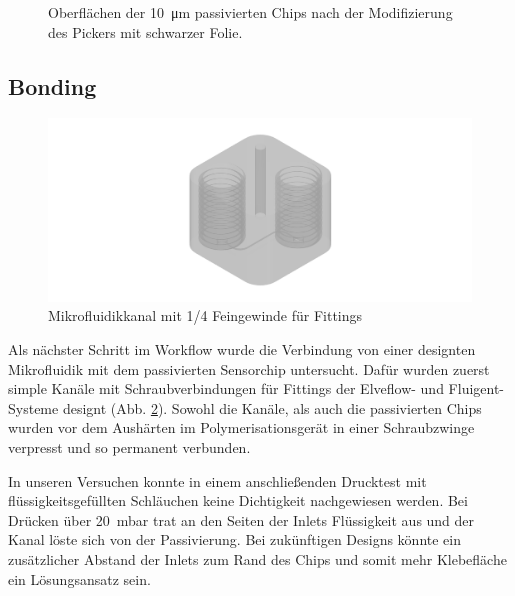 \begin{figure}[htb!]
\begin{subfigure}[r]{0.3\linewidth}
\end{subfigure}
\caption{Oberflächen der \SI{10}{\micro\meter} passivierten Chips nach der Modifizierung des Pickers mit schwarzer Folie.}
\label{fig:Microfilm}
\end{figure}



\subsection{Bonding}

\begin{figure}
    \centering
    \vspace{-16pt}
    \includegraphics[clip,trim=11mm 2 10mm 3,width=1.15\linewidth] {img/Fitting.png}
    \caption{Mikrofluidikkanal mit 1/4 Feingewinde für Fittings}
    \label{fig:Mikrofluidik_Gewinde}
\end{figure}
Als nächster Schritt im Workflow wurde die Verbindung von einer designten Mikrofluidik mit dem passivierten Sensorchip untersucht. Dafür wurden zuerst simple Kanäle mit Schraubverbindungen für Fittings der Elveflow- und Fluigent-Systeme designt (Abb. \ref{fig:Mikrofluidik_Gewinde}). Sowohl die Kanäle, als auch die passivierten Chips wurden vor dem Aushärten im Polymerisationsgerät in einer Schraubzwinge verpresst und so permanent verbunden.

In unseren Versuchen konnte in einem anschließenden Drucktest mit flüssigkeitsgefüllten Schläuchen keine Dichtigkeit nachgewiesen werden. Bei Drücken über \SI{20}{\milli\bar} trat an den Seiten der Inlets Flüssigkeit aus und der Kanal löste sich von der Passivierung. Bei zukünftigen Designs könnte ein zusätzlicher Abstand der Inlets zum Rand des Chips und somit mehr Klebefläche ein Lösungsansatz sein. \\

